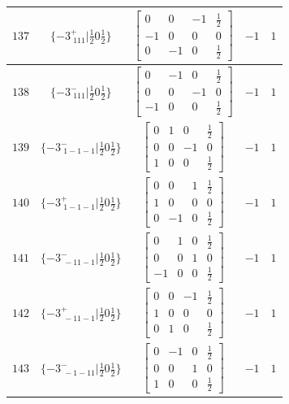\documentclass[fleqn,8pt]{jsarticle}
\begin{document}
\begin{longtable}{ccccc}
$ 137 $ & $ \{-3^{+}_{\,\,111}|\frac{1}{2} 0 \frac{1}{2}\} $ & $ \begin{bmatrix} 0 & 0 & -1 & \frac{1}{2} \\ -1 & 0 & 0 & 0 \\ 0 & -1 & 0 & \frac{1}{2} \end{bmatrix} $ & $ -1 $ & $ 1 $ \\ \hline
$ 138 $ & $ \{-3^{-}_{\,\,111}|\frac{1}{2} 0 \frac{1}{2}\} $ & $ \begin{bmatrix} 0 & -1 & 0 & \frac{1}{2} \\ 0 & 0 & -1 & 0 \\ -1 & 0 & 0 & \frac{1}{2} \end{bmatrix} $ & $ -1 $ & $ 1 $ \\ \hline
$ 139 $ & $ \{-3^{-}_{\,\,1-1-1}|\frac{1}{2} 0 \frac{1}{2}\} $ & $ \begin{bmatrix} 0 & 1 & 0 & \frac{1}{2} \\ 0 & 0 & -1 & 0 \\ 1 & 0 & 0 & \frac{1}{2} \end{bmatrix} $ & $ -1 $ & $ 1 $ \\ \hline
$ 140 $ & $ \{-3^{+}_{\,\,1-1-1}|\frac{1}{2} 0 \frac{1}{2}\} $ & $ \begin{bmatrix} 0 & 0 & 1 & \frac{1}{2} \\ 1 & 0 & 0 & 0 \\ 0 & -1 & 0 & \frac{1}{2} \end{bmatrix} $ & $ -1 $ & $ 1 $ \\ \hline
$ 141 $ & $ \{-3^{-}_{\,\,-11-1}|\frac{1}{2} 0 \frac{1}{2}\} $ & $ \begin{bmatrix} 0 & 1 & 0 & \frac{1}{2} \\ 0 & 0 & 1 & 0 \\ -1 & 0 & 0 & \frac{1}{2} \end{bmatrix} $ & $ -1 $ & $ 1 $ \\ \hline
$ 142 $ & $ \{-3^{+}_{\,\,-11-1}|\frac{1}{2} 0 \frac{1}{2}\} $ & $ \begin{bmatrix} 0 & 0 & -1 & \frac{1}{2} \\ 1 & 0 & 0 & 0 \\ 0 & 1 & 0 & \frac{1}{2} \end{bmatrix} $ & $ -1 $ & $ 1 $ \\ \hline
$ 143 $ & $ \{-3^{-}_{\,\,-1-11}|\frac{1}{2} 0 \frac{1}{2}\} $ & $ \begin{bmatrix} 0 & -1 & 0 & \frac{1}{2} \\ 0 & 0 & 1 & 0 \\ 1 & 0 & 0 & \frac{1}{2} \end{bmatrix} $ & $ -1 $ & $ 1 $ \\ \hline

\end{longtable}
\end{document}
